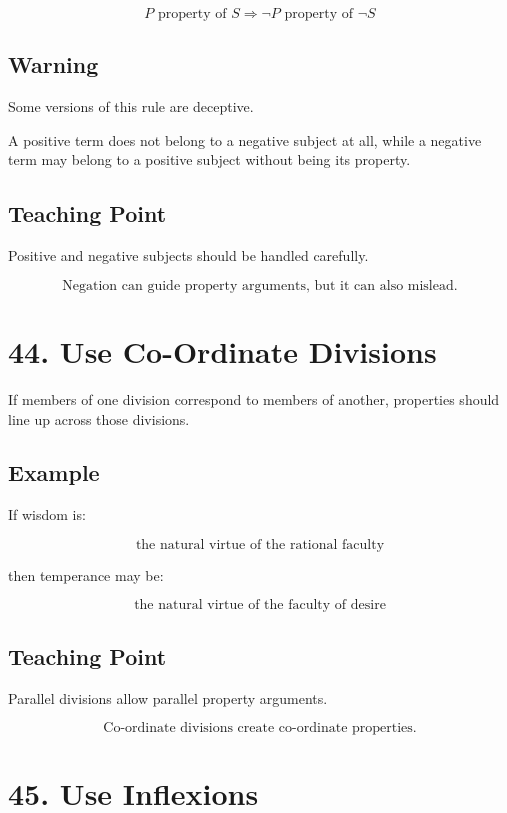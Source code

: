 \documentclass[12pt]{article}
\begin{document}
\[
P \text{ property of } S
\Rightarrow
\neg P \text{ property of } \neg S
\]

\subsection*{Warning}

Some versions of this rule are deceptive.

A positive term does not belong to a negative subject at all, while a negative
term may belong to a positive subject without being its property.

\subsection*{Teaching Point}

Positive and negative subjects should be handled carefully.

\[
\boxed{
\text{Negation can guide property arguments, but it can also mislead.}
}
\]

\section*{44. Use Co-Ordinate Divisions}

If members of one division correspond to members of another, properties should
line up across those divisions.

\subsection*{Example}

If wisdom is:

\[
\text{the natural virtue of the rational faculty}
\]

then temperance may be:

\[
\text{the natural virtue of the faculty of desire}
\]

\subsection*{Teaching Point}

Parallel divisions allow parallel property arguments.

\[
\boxed{
\text{Co-ordinate divisions create co-ordinate properties.}
}
\]

\section*{45. Use Inflexions}
\end{document}

